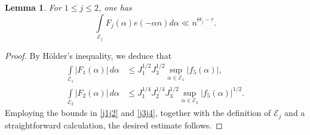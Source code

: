 \documentclass[10pt,a4paper]{amsart}
\newtheorem{lemma}{Lemma}
\begin{document}
\begin{lemma}\label{epsilon}
   For $1\leq j \leq 2$, one has 
   $$ \int \limits_{\mathcal{E}_j} F_j(\alpha)e(-\alpha n)d\alpha \ll n^{\Theta_j - \tau}.$$
\end{lemma}

\begin{proof}
    By H\"older’s inequality, we deduce that 
    \begin{align*}
        \int \limits_{\mathcal{E}_1} |F_1(\alpha)|\,d\alpha &\leq J_1^{1/2}J_3^{1/2} \sup \limits_{\alpha \in \mathcal{E}_1}|f_{5}(\alpha)|,\\
        \int \limits_{\mathcal{E}_2} |F_2(\alpha)|\,d\alpha &\leq J_1^{1/4}J_2^{1/4}J_3^{1/2} \sup \limits_{\alpha \in \mathcal{E}_2}|f_{5}(\alpha)|^{1/2}.
    \end{align*}
    Employing the bounds in \eqref{j1j2} and \eqref{j3j4}, together with the definition of $\mathcal{E}_j$ and a straightforward calculation, the desired estimate follows.
\end{proof}
\end{document}
